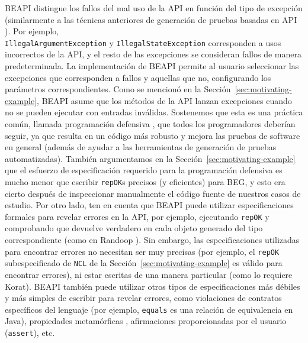 \textsf{BEAPI} distingue los fallos del mal uso de la API en función del tipo de excepción (similarmente a las técnicas anteriores de generación de pruebas basadas en API \cite{Pacheco07}). 
Por ejemplo, \\
\texttt{IllegalArgumentException} y \texttt{IllegalStateException} corresponden a usos incorrectos de la API, y el resto de las excepciones se consideran fallos de manera predeterminada. 
La implementación de \textsf{BEAPI} permite al usuario seleccionar las excepciones que corresponden a fallos y aquellas que no, configurando los parámetros correspondientes. 
Como se mencionó en la Sección~\ref{sec:motivating-example}, \textsf{BEAPI} asume que los métodos de la API lanzan excepciones cuando no se pueden ejecutar con entradas inválidas. 
Sostenemos que esta es una práctica común, llamada programación defensiva \cite{Liskov00}, 
que todos los programadores deberían seguir, ya que resulta en un código más robusto y 
mejora las pruebas de software en general \cite{Ammann16} (además de ayudar a las herramientas de generación de pruebas automatizadas). 
También argumentamos en la Sección~\ref{sec:motivating-example} que el esfuerzo de especificación requerido para la programación defensiva es mucho menor que escribir \texttt{repOK}s precisos (y eficientes) para BEG, 
y esto era cierto después de inspeccionar manualmente el código fuente de nuestros casos de estudio. 
Por otro lado, ten en cuenta que \textsf{BEAPI} puede utilizar especificaciones formales para revelar errores en la API, por ejemplo, 
ejecutando \texttt{repOK} y comprobando que devuelve verdadero en cada objeto generado del tipo correspondiente (como en Randoop \cite{Pacheco07}). 
Sin embargo, las especificaciones utilizadas para encontrar errores no necesitan ser muy precisas (por ejemplo, el \texttt{repOK} subespecificado de \texttt{NCL} de la Sección~\ref{sec:motivating-example} 
es válido para encontrar errores), ni estar escritas de una manera particular (como lo requiere \textsf{Korat}). 
\textsf{BEAPI} también puede utilizar otros tipos de especificaciones más débiles y 
más simples de escribir para revelar errores, como violaciones de contratos específicos del lenguaje 
(por ejemplo, \texttt{equals} es una relación de equivalencia en Java), propiedades metamórficas \cite{Chen19}, afirmaciones proporcionadas por el usuario (\texttt{assert}), etc.

